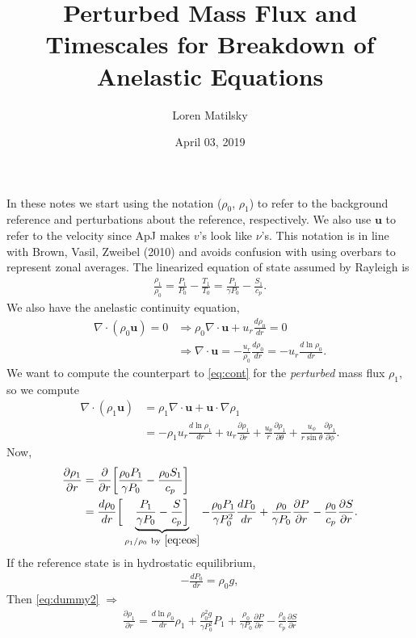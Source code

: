 \documentclass[12pt]{article} %
\date{April 03, 2019}
\author{Loren Matilsky}
\title{Perturbed Mass Flux and Timescales for Breakdown of Anelastic Equations}
\newcommand{\pderiv}[2]{\frac{\partial#1}{\partial#2}}
\begin{document}
	\maketitle
	In these notes we start using the notation ($\rho_0$, $\rho_1$) to refer to the background reference and perturbations about the reference, respectively. We also use $\bm{u}$ to refer to the velocity since ApJ makes $v$'s look like $\nu$'s. This notation is in line with Brown, Vasil, Zweibel (2010) and avoids confusion with using overbars to represent zonal averages. The linearized equation of state assumed by Rayleigh is
	\begin{align}
	\frac{\rho_1}{\rho_0} = \frac{P_1}{P_0} - \frac{T_1}{T_0} = \frac{P_1}{\gamma P_0}
	- \frac{S_1}{c_p}.
	\label{eq:eos}
	\end{align}
	We also have the anelastic continuity equation,
	\begin{align}
	\nabla\cdot(\rho_0\bm{u})=0 &\Longrightarrow 
	\rho_0\nabla\cdot\bm{u} + u_r\frac{d\rho_0}{dr} = 0\label{eq:cont}\\
	&\Longrightarrow \nabla\cdot\bm{u} = -\frac{u_r}{\rho_0}\frac{d\rho_0}{dr} = 
	-u_r\frac{d\ln{\rho_0}}{dr}.
	\label{eq:divu}
	\end{align}
	We want to compute the counterpart to \eqref{eq:cont} for the \textit{perturbed} mass flux $\rho_1$, so we compute
	\begin{align}
	\nabla\cdot(\rho_1\bm{u}) &= \rho_1\nabla\cdot\bm{u}+\bm{u}\cdot\nabla\rho_1\nonumber\\
	&=-\rho_1u_r\frac{d\ln{\rho_1}}{dr} + u_r\pderiv{\rho_1}{r} + \frac{u_\theta}{r}
	\pderiv{\rho_1}{\theta} + \frac{u_\phi}{r\sin\theta}\pderiv{\rho_1}{\phi}.
	\label{eq:dummy1}
	\end{align}
	Now, 
	\begin{align}
	\pderiv{\rho_1}{r}&=\pderiv{}{r}\bigg{[}\frac{\rho_0P_1}{\gamma P_0} - 
	\frac{\rho_0S_1}{c_p}\bigg{]}\nonumber\\
	&=\frac{d\rho_0}{dr}\bigg{[}\underbrace{\frac{P_1}{\gamma P_0} - \frac{S}{c_p}\bigg{]}}_{\rho_1/\rho_0\ \text{by}\ \eqref{eq:eos}} -
	\frac{\rho_0P_1}{\gamma P_0^2}\frac{dP_0}{dr} + \frac{\rho_0}{\gamma P_0}
	\pderiv{P}{r} - \frac{\rho_0}{c_p}\pderiv{S}{r}.
	\label{eq:dummy2}
	\end{align}
	If the reference state is in hydrostatic equilibrium, 
	\begin{align}
	-\frac{dP_0}{dr}=\rho_0g,
	\end{align}
	Then \eqref{eq:dummy2} $\Longrightarrow$
	\begin{align}
	\pderiv{\rho_1}{r} = \frac{d\ln{\rho_0}}{dr}\rho_1 + \frac{\rho_0^2g}
	{\gamma P_0^2}P_1 + \frac{\rho_0}{\gamma P_0}
	\pderiv{P}{r} - \frac{\rho_0}{c_p}\pderiv{S}{r}
	\end{align}
\end{document}
